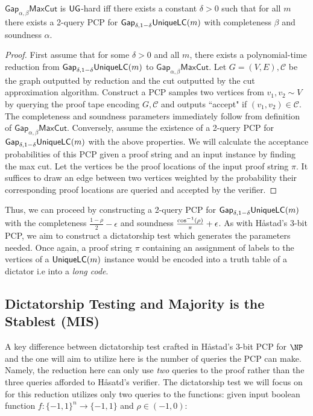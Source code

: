 \begin{theorem}
  $\mathsf{Gap}_{\alpha,\beta}\mathsf{MaxCut}$ is $\mathsf{UG}$-hard iff there exists a constant $\delta > 0$ such that for all $m$ there exists a 2-query PCP for $\mathsf{Gap}_{\delta, 1-\delta}\mathsf{UniqueLC}(m)$ with completeness $\beta$ and soundness $\alpha$.
\end{theorem}
%
\begin{proof}
  First assume that for some $\delta > 0$ and all $m$, there exists a polynomial-time reduction from $\mathsf{Gap}_{\delta, 1-\delta}\mathsf{UniqueLC}(m)$ to $\mathsf{Gap}_{\alpha,\beta}\mathsf{MaxCut}$. Let $G=(V,E), \mathcal{C}$ be the graph outputted by reduction and the cut outputted by the cut approximation algorithm. Construct a PCP samples two vertices from $v_1, v_2 \sim V$ by querying the proof tape encoding $G,\mathcal{C}$ and outputs ``accept" if $(v_1,v_2) \in \mathcal{C}$. The completeness and soundness parameters immediately follow from definition of $\mathsf{Gap}_{\alpha,\beta}\mathsf{MaxCut}$. Conversely, assume the existence of a 2-query PCP for $\mathsf{Gap}_{\delta, 1-\delta}\mathsf{UniqueLC}(m)$ with the above properties. We will calculate the acceptance probabilities of this PCP given a proof string and an input instance by finding the max cut. Let the vertices be the proof locations of the input proof string $\pi$. It suffices to draw an edge between two vertices weighted by the probability their corresponding proof locations are queried and accepted by the verifier.
\end{proof}

Thus, we can proceed by constructing a 2-query PCP for $\mathsf{Gap}_{\delta, 1-\delta}\mathsf{UniqueLC}(m)$ with the completeness $\frac{1-\rho}{2} - \epsilon$ and soundness $\frac{\cos^{-1}(\rho)}{\pi} + \epsilon$. As with H\aa stad's 3-bit PCP, we aim to construct a dictatorship test which generates the parameters needed. Once again, a proof string $\pi$ containing an assignment of labels to the vertices of a $\mathsf{UniqueLC}(m)$ instance would be encoded into a truth table of a dictator i.e into a \emph{long code}. \newline

%
%
%
\subsection{Dictatorship Testing and Majority is the Stablest (MIS)}
A key difference between dictatorship test crafted in H\aa stad's 3-bit PCP for $\NP$ and the one will aim to utilize here is the number of queries the PCP can make. Namely, the reduction here can only use \emph{two} queries to the proof rather than the three queries afforded to H\aa satd's verifier. The dictatorship test we will focus on for this reduction utilizes only two queries to the functions: given input boolean function $f:\{-1,1\}^n \rightarrow \{-1,1\}$ and $\rho \in (-1,0)$:

